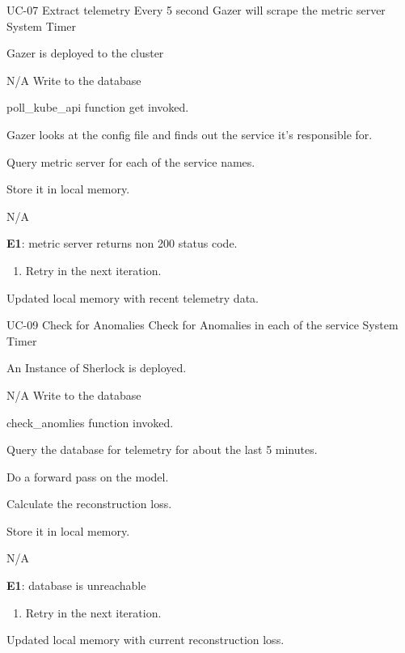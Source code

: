 \vspace{-2em}
\UseCaseDescription
{UC-07}
{Extract telemetry}
{Every 5 second Gazer will scrape the metric server}
{System Timer}
{\begin{CompactItemizes}
    \item Gazer is deployed to the cluster
\end{CompactItemizes}}
{N/A}
{Write to the database}
{\begin{CompactEnumerate}
    \item poll\_kube\_api function get invoked.
    \item Gazer looks at the config file and finds out the service it’s responsible for.
    \item Query metric server for each of the service names.
    \item Store it in local memory.
\end{CompactEnumerate}}
{{N/A}
{\textbf{E1}: metric server returns non 200 status code.
\vspace{-4mm}\begin{enumerate}
    \item Retry in the next iteration.
\vspace{-7mm}\end{enumerate}}
{\begin{CompactItemizes}
    \item Updated local memory with recent telemetry data.
\end{CompactItemizes}}}

\vspace{-2em}
\UseCaseDescription
{UC-09}
{Check for Anomalies}
{Check for Anomalies in each of the service}
{System Timer}
{\begin{CompactItemizes}
    \item An Instance of Sherlock is deployed.
\end{CompactItemizes}}
{N/A}
{Write to the database}
{\begin{CompactEnumerate}
    \item check\_anomlies function invoked.
    \item Query the database for telemetry for about the last 5 minutes.
    \item Do a forward pass on the model.
    \item Calculate the reconstruction loss.
    \item Store it in local memory.
\end{CompactEnumerate}}
{{N/A}
{\textbf{E1}: database is unreachable
\vspace{-4mm}\begin{enumerate}
    \item Retry in the next iteration.
\vspace{-7mm}\end{enumerate}}
{\begin{CompactItemizes}
    \item Updated local memory with current reconstruction loss.
\end{CompactItemizes}}}
